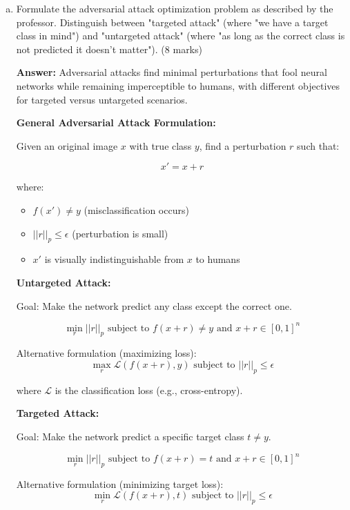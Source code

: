 \documentclass[12pt]{article}
\newcommand{\answer}[1]{{\color{answercolor}\textbf{Answer:} #1}}
\newcommand{\explanation}[1]{{\color{explanationcolor}#1}}
\begin{document}
\begin{enumerate}[(a)]
    \item Formulate the adversarial attack optimization problem as described by the professor. Distinguish between "targeted attack" (where "we have a target class in mind") and "untargeted attack" (where "as long as the correct class is not predicted it doesn't matter"). \hfill (8 marks)
    
    \answer{Adversarial attacks find minimal perturbations that fool neural networks while remaining imperceptible to humans, with different objectives for targeted versus untargeted scenarios.}
    
    \explanation{
    \textbf{General Adversarial Attack Formulation:}
    
    Given an original image $x$ with true class $y$, find a perturbation $r$ such that:
    
    $$x' = x + r$$
    
    where:
    \begin{itemize}
        \item $f(x') \neq y$ (misclassification occurs)
        \item $||r||_p \leq \epsilon$ (perturbation is small)
        \item $x'$ is visually indistinguishable from $x$ to humans
    \end{itemize}
    
    \textbf{Untargeted Attack:}
    
    Goal: Make the network predict any class except the correct one.
    
    $$\min_{r} ||r||_p \text{ subject to } f(x + r) \neq y \text{ and } x + r \in [0,1]^n$$
    
    Alternative formulation (maximizing loss):
    $$\max_{r} \mathcal{L}(f(x + r), y) \text{ subject to } ||r||_p \leq \epsilon$$
    
    where $\mathcal{L}$ is the classification loss (e.g., cross-entropy).
    
    \textbf{Targeted Attack:}
    
    Goal: Make the network predict a specific target class $t \neq y$.
    
    $$\min_{r} ||r||_p \text{ subject to } f(x + r) = t \text{ and } x + r \in [0,1]^n$$
    
    Alternative formulation (minimizing target loss):
    $$\min_{r} \mathcal{L}(f(x + r), t) \text{ subject to } ||r||_p \leq \epsilon$$
    
}
\end{enumerate}
\end{document}
